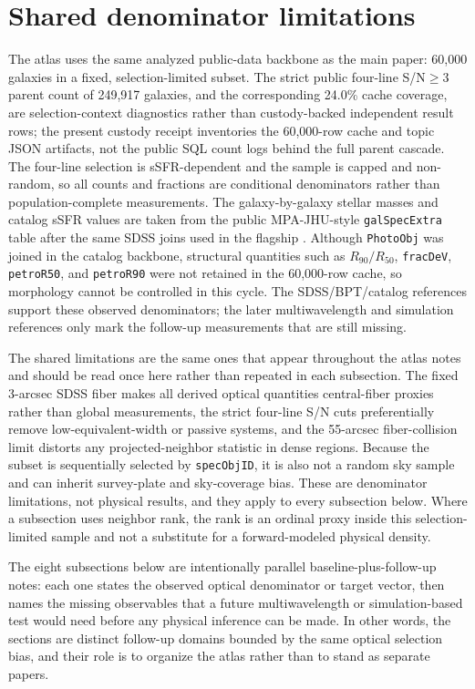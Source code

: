 \documentclass[twocolumn]{aastex631}
\begin{document}
\section{Shared denominator limitations}
The atlas uses the same analyzed public-data backbone as the main paper: 60,000 galaxies in a fixed, selection-limited subset. The strict public four-line S/N$\geq3$ parent count of 249,917 galaxies, and the corresponding 24.0\% cache coverage, are selection-context diagnostics rather than custody-backed independent result rows; the present custody receipt inventories the 60,000-row cache and topic JSON artifacts, not the public SQL count logs behind the full parent cascade. The four-line selection is sSFR-dependent and the sample is capped and non-random, so all counts and fractions are conditional denominators rather than population-complete measurements. The galaxy-by-galaxy stellar masses and catalog sSFR values are taken from the public MPA-JHU-style \texttt{galSpecExtra} table after the same SDSS joins used in the flagship \citep{sdssdr17,brinchmann2004,york2000}. Although \texttt{PhotoObj} was joined in the catalog backbone, structural quantities such as \(R_{90}/R_{50}\), \texttt{fracDeV}, \texttt{petroR50}, and \texttt{petroR90} were not retained in the 60,000-row cache, so morphology cannot be controlled in this cycle. The SDSS/BPT/catalog references support these observed denominators; the later multiwavelength and simulation references only mark the follow-up measurements that are still missing.

The shared limitations are the same ones that appear throughout the atlas notes and should be read once here rather than repeated in each subsection. The fixed 3-arcsec SDSS fiber makes all derived optical quantities central-fiber proxies rather than global measurements, the strict four-line S/N cuts preferentially remove low-equivalent-width or passive systems, and the 55-arcsec fiber-collision limit distorts any projected-neighbor statistic in dense regions. Because the subset is sequentially selected by \texttt{specObjID}, it is also not a random sky sample and can inherit survey-plate and sky-coverage bias. These are denominator limitations, not physical results, and they apply to every subsection below. Where a subsection uses neighbor rank, the rank is an ordinal proxy inside this selection-limited sample and not a substitute for a forward-modeled physical density.

The eight subsections below are intentionally parallel baseline-plus-follow-up notes: each one states the observed optical denominator or target vector, then names the missing observables that a future multiwavelength or simulation-based test would need before any physical inference can be made. In other words, the sections are distinct follow-up domains bounded by the same optical selection bias, and their role is to organize the atlas rather than to stand as separate papers.
\end{document}
